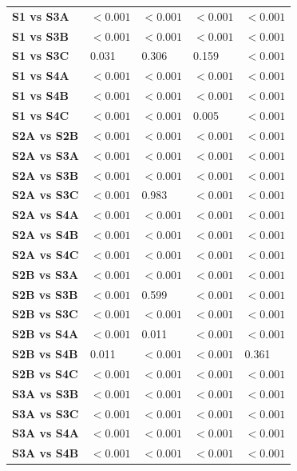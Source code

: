 \begin{table}[H]
{\begin{tabular}{lllll}
        \textbf{S1 vs S3A} & $< 0.001$ & $< 0.001$ & $< 0.001$ & $< 0.001$ \\
        \textbf{S1 vs S3B} & $< 0.001$ & $< 0.001$ & $< 0.001$ & $< 0.001$ \\
        \textbf{S1 vs S3C} & 0.031 & 0.306 & 0.159 & $< 0.001$ \\
        \textbf{S1 vs S4A} & $< 0.001$ & $< 0.001$ & $< 0.001$ & $< 0.001$ \\
        \textbf{S1 vs S4B} & $< 0.001$ & $< 0.001$ & $< 0.001$ & $< 0.001$ \\
        \textbf{S1 vs S4C} & $< 0.001$ & $< 0.001$ & 0.005 & $< 0.001$ \\
        \textbf{S2A vs S2B} & $< 0.001$ & $< 0.001$ & $< 0.001$ & $< 0.001$ \\
        \textbf{S2A vs S3A} & $< 0.001$ & $< 0.001$ & $< 0.001$ & $< 0.001$ \\
        \textbf{S2A vs S3B} & $< 0.001$ & $< 0.001$ & $< 0.001$ & $< 0.001$ \\
        \textbf{S2A vs S3C} & $< 0.001$ & 0.983 & $< 0.001$ & $< 0.001$ \\
        \textbf{S2A vs S4A} & $< 0.001$ & $< 0.001$ & $< 0.001$ & $< 0.001$ \\
        \textbf{S2A vs S4B} & $< 0.001$ & $< 0.001$ & $< 0.001$ & $< 0.001$ \\
        \textbf{S2A vs S4C} & $< 0.001$ & $< 0.001$ & $< 0.001$ & $< 0.001$ \\
        \textbf{S2B vs S3A} & $< 0.001$ & $< 0.001$ & $< 0.001$ & $< 0.001$ \\
        \textbf{S2B vs S3B} & $< 0.001$ & 0.599 & $< 0.001$ & $< 0.001$ \\
        \textbf{S2B vs S3C} & $< 0.001$ & $< 0.001$ & $< 0.001$ & $< 0.001$ \\
        \textbf{S2B vs S4A} & $< 0.001$ & 0.011 & $< 0.001$ & $< 0.001$ \\
        \textbf{S2B vs S4B} & 0.011 & $< 0.001$ & $< 0.001$ & 0.361 \\
        \textbf{S2B vs S4C} & $< 0.001$ & $< 0.001$ & $< 0.001$ & $< 0.001$ \\
        \textbf{S3A vs S3B} & $< 0.001$ & $< 0.001$ & $< 0.001$ & $< 0.001$ \\
        \textbf{S3A vs S3C} & $< 0.001$ & $< 0.001$ & $< 0.001$ & $< 0.001$ \\
        \textbf{S3A vs S4A} & $< 0.001$ & $< 0.001$ & $< 0.001$ & $< 0.001$ \\
        \textbf{S3A vs S4B} & $< 0.001$ & $< 0.001$ & $< 0.001$ & $< 0.001$ \\

\end{tabular}}
\end{table}
